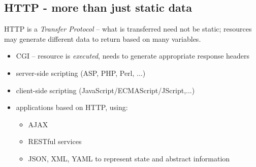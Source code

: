 \documentclass[xga]{xdvislides}
\begin{document}
\subsection{HTTP - more than just static data}
HTTP is a {\em Transfer Protocol} -- what is transferred need not be
static; resources may generate different data to return based on many
variables.

\begin{itemize}
	\item CGI -- resource is {\em executed}, needs to generate
		appropriate response headers
	\item server-side scripting (ASP, PHP, Perl, ...)
	\item client-side scripting (JavaScript/ECMAScript/JScript,...)
	\item applications based on HTTP, using:
		\begin{itemize}
			\item AJAX
			\item RESTful services
			\item JSON, XML, YAML to represent state and
				abstract information
		\end{itemize}
\end{itemize}

%
%
\end{document}
